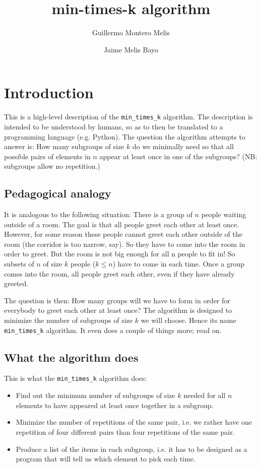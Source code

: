 \documentclass[a4paper]{article}
\title{min-times-k algorithm}
\author{Guillermo Montero Melis \and Jaime Melis Bayo}
\begin{document}
\maketitle

\section{Introduction}

This is a high-level description of the \verb:min_times_k: algorithm.
The description is intended to be understood by humans, so as to then be translated to a programming language (e.g. Python).
The question the algorithm attempts to answer is:
How many subgroups of size $k$ do we minimally need so that all possible pairs of elements in $n$ appear at least once in one of the subgroups? (NB: subgroups allow no repetition.)

\subsection{Pedagogical analogy}
\label{ssec:pedag}

It is analogous to the following situation:
There is a group of $n$ people waiting outside of a room.
The goal is that all people greet each other at least once.
However, for some reason these people cannot greet each other outside of the room (the corridor is too narrow, say). So they have to come into the room in order to greet.
But the room is not big enough for all n people to fit in! So subsets of $n$ of size $k$ people ($k \leq n$) have to come in each time.
Once a group comes into the room, all people greet each other, even if they have already greeted.

The question is then: How many groups will we have to form in order for everybody to greet each other at least once?
The algorithm is designed to minimize the number of subgroups of size $k$ we will choose.
Hence its name \verb:min_times_k: algorithm.
It even does a couple of things more; read on.

\subsection{What the algorithm does}

This is what the \verb:min_times_k: algorithm does:

\begin{itemize}
\item Find out the minimum number of subgroups of size $k$ needed for all $n$ elements to have appeared at least once together in a subgroup.
\item Minimize the number of repetitions of the same pair, i.e. we rather have one repetition of four different pairs than four repetitions of the same pair.
\item Produce a list of the items in each subgroup, i.e. it has to be designed as a program that will tell us which element to pick each time.
\end{itemize}
\end{document}
